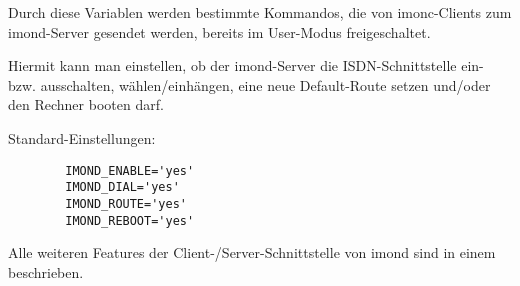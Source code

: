 \begin{description}

    {Durch diese Variablen werden bestimmte Kommandos, die von
      imonc-Clients zum imond-Server gesendet werden, bereits im
      User-Modus freigeschaltet.

      Hiermit kann man einstellen, ob der imond-Server die
      ISDN-Schnittstelle ein- bzw. ausschalten, wählen/einhängen, eine neue
      Default-Route setzen und/oder den Rechner booten darf.


      Standard-Einstellungen:

    \begin{example}
      \begin{verbatim}
        IMOND_ENABLE='yes'
        IMOND_DIAL='yes'
        IMOND_ROUTE='yes'
        IMOND_REBOOT='yes'
      \end{verbatim}
    \end{example}

      Alle weiteren Features der Client-/Server-Schnittstelle von imond sind in
      einem  beschrieben.}
\end{description}
